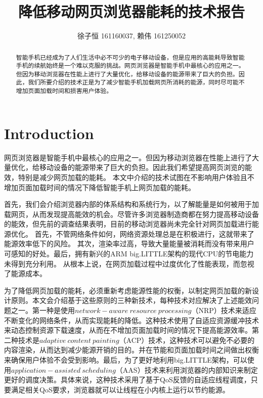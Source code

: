 \documentclass[sigconf]{acmart}
\begin{document}
\title{降低移动网页浏览器能耗的技术报告}

\author{徐子恒 161160037, 赖伟 161250052}

\begin{abstract}

智能手机已经成为了人们生活中必不可少的电子移动设备，但是应用的高能耗导致智能手机的续航始终是一个难以克服的挑战。网页浏览器是智能手机中最核心的应用之一。但因为移动浏览器在性能上进行了大量优化，给移动设备的能源带来了巨大的负担。因此，我们所要介绍的技术正是为了减少智能手机加载网页所消耗的能源，同时尽可能不增加页面加载时间和损害用户体验。

\end{abstract}


\maketitle

\section{Introduction}

网页浏览器是智能手机中最核心的应用之一。但因为移动浏览器在性能上进行了大量优化，给移动设备的能源带来了巨大的负担。因此我们希望提高网页浏览的能效，特别是减少网页加载的能耗。 本文中介绍的技术试图在不影响用户体验且不增加页面加载时间的情况下降低智能手机上网页加载的能耗。

首先，我们会介绍浏览器内部的体系结构和系统行为，以了解能量是如何被用于加载网页，从而发现提高能效的机会。尽管许多浏览器制造商都在努力提高移动设备的能效，但先前的调查结果表明，目前的移动浏览器尚未完全针对网页加载进行能源优化。 首先，不管网络条件如何，网络资源处理总是在积极进行，这就带来了能源效率低下的风险。 其次，渲染率过高，导致大量能量被消耗而没有带来用户可感知的好处。最后，拥有新兴的ARM big.LITTLE架构\cite{3}的现代CPU的节电能力未得到充分利用。 从根本上说，在网页加载过程中过度优化了性能表现，而忽视了能源成本。

为了降低网页加载的能耗，必须重新考虑能源性能的权衡，以制定网页加载的新设计原则。本文会介绍基于这些原则的三种新技术，每种技术对应解决了上述能效问题之一。第一种是使用$network-aware\ resource\ processing$（NRP）技术来适应不断变化的网络条件，从而实现能耗的降低。这种技术使用了自适应资源缓冲技术来动态控制资源下载速度，从而在不增加页面加载时间的情况下提高能源效率。第二种技术是$adaptive\ content\ painting$（ACP）技术，这种技术可以避免不必要的内容渲染，从而达到减少能源开销的目的。并在节能和页面加载时间之间做出权衡来确保用户体验不会受到影响。最后，为了更好地利用big.LITTLE架构，可以使用$application-assisted\ scheduling$（AAS）技术来利用浏览器的内部知识来制定更好的调度决策。具体来说，这种技术采用了基于QoS反馈的自适应线程调度，只要满足相关QoS要求，浏览器就可以让线程在小内核上运行以节约能源。
\end{document}
